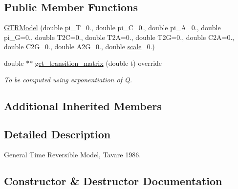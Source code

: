 \subsection*{Public Member Functions}
\begin{DoxyCompactItemize}
\item 
\mbox{\hyperlink{classrcombinator_1_1GTRModel_a0493ce5888bbaf6f0c856493b273a6ef}{G\+T\+R\+Model}} (double pi\+\_\+T=0., double pi\+\_\+C=0., double pi\+\_\+A=0., double pi\+\_\+G=0., double T2C=0., double T2A=0., double T2G=0., double C2A=0., double C2G=0., double A2G=0., double \mbox{\hyperlink{classrcombinator_1_1PointMutationModel_a328a30a438bb1b6a625faa3f714a85c8}{scale}}=0.)
\item 
\mbox{\label{classrcombinator_1_1GTRModel_aca26ae97d8ee3af6cc3c372d4d606e64}} 
double $\ast$$\ast$ \mbox{\hyperlink{classrcombinator_1_1GTRModel_aca26ae97d8ee3af6cc3c372d4d606e64}{get\+\_\+transition\+\_\+matrix}} (double t) override
\begin{DoxyCompactList}\small\item\em To be computed using exponentiation of Q. \end{DoxyCompactList}\end{DoxyCompactItemize}
\subsection*{Additional Inherited Members}


\subsection{Detailed Description}
General Time Reversible Model, Tavare 1986. 

\subsection{Constructor \& Destructor Documentation}
\mbox{\label{classrcombinator_1_1GTRModel_a0493ce5888bbaf6f0c856493b273a6ef}} 
